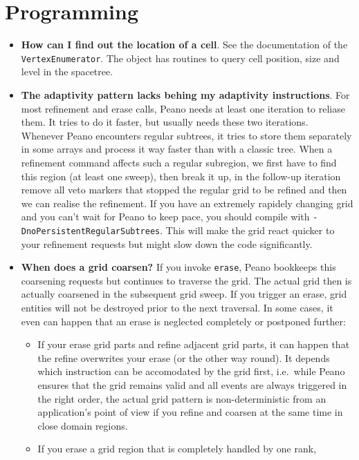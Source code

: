 \section{Programming}

\begin{itemize}
  \item \textbf{ How can I find out the location of a cell}. See the
  documentation of the \texttt{VertexEnumerator}. The object has routines to query cell
  position, size and level in the spacetree.
  \item \textbf{ The adaptivity pattern lacks behing my adaptivity
  instructions}.
  For most refinement and erase calls, Peano needs at least one iteration to
  reliase them. It tries to do it faster, but usually needs these two
  iterations. Whenever Peano encounters regular subtrees, it tries to store 
  them separately in some arrays and process it way faster than with a classic
  tree. When a refinement command affects such a regular subregion, we first 
  have to find this region (at least one sweep), then break it up, in the
  follow-up iteration remove all veto markers that stopped the regular grid to
  be refined and then we can realise the refinement. If you have an extremely
  rapidely changing grid and you can't wait for Peano to keep pace, you should
  compile with \texttt{-DnoPersistentRegularSubtrees}. This will make the grid
  react quicker to your refinement requests but might slow down the code
  significantly.
  \item \textbf{ When does a grid coarsen?} If you invoke \texttt{erase}, Peano
  bookkeeps this coarsening requests but continues to traverse the grid. The
  actual grid then is actually coarsened in the subsequent grid sweep. If you
  trigger an erase, grid entities will not be destroyed prior to the next
  traversal. In some cases, it even can happen that an erase is neglected
  completely or postponed further:
  \begin{itemize}
    \item If your erase grid parts and refine adjacent grid parts, it can happen
    that the refine overwrites your erase (or the other way round). It depends
    which instruction can be accomodated by the grid first, i.e.~while Peano
    ensures that the grid remains valid and all events are always triggered in
    the right order, the actual grid pattern is non-deterministic from an
    application's point of view if you refine and coarsen at the same time in
    close domain regions.
    \item If you erase a grid region that is completely handled by one rank,

\end{itemize}
\end{itemize}
